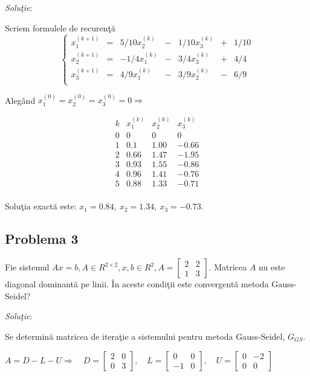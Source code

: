 \documentclass{exam}
\begin{document}
\textit{Solu\c{t}ie}:

Scriem formulele de recuren\c{t}\u{a}
$$\left\{
	\begin{array}{ccccccc}
		x_1^{(k+1)} & = & 5/10x_2^{(k)} & - & 1/10x_3^{(k)} & + & 1/10 \\
		x_2^{(k+1)} & = & -1/4x_1^{(k)} & - & 3/4x_3^{(k)}  & + & 4/4  \\
		x_3^{(k+1)} & = & 4/9x_1^{(k)}  & - & 3/9x_2^{(k)}  & - & 6/9  \\
	\end{array} \right.
$$

Aleg\^{a}nd $x_{1}^{(0)}=x_{2}^{(0)}=x_3^{(0)}=0\Rightarrow$


$$  \begin{array}{c||ccc}
		k & x_1^{(k)} & x_2^{(k)} & x_3^{(k)} \\
		\hline
		0 & 0         & 0         & 0         \\
		1 & 0.1       & 1.00      & -0.66     \\
		2 & 0.66      & 1.47      & -1.95     \\
		3 & 0.93      & 1.55      & -0.86     \\
		4 & 0.96      & 1.41      & -0.76     \\
		5 & 0.88      & 1.33      & -0.71     \\
	\end{array}
$$

Solu\c{t}ia exact\u{a} este: $x_{1}=0.84,\ x_{2}=1.34,\ x_{3}=-0.73$.

\subsection{Problema 3}
Fie sistemul $Ax=b, A \in R^{2\times 2}, x, b \in R^{2},
	A =
	\left[ {\begin{array}{cc}
					2 & 2 \\
					1 & 3
				\end{array} } \right]
$. Matricea $A$ nu este diagonal dominant\u{a} pe linii. \^{I}n aceste condi\c{t}ii este convergent\u{a} metoda Gauss-Seidel?

\textit{Solu\c{t}ie}:

Se determin\u{a} matricea de itera\c{t}ie a sistemului pentru metoda Gauss-Seidel, ${G}_{GS}$.

$A = D - L - U \Rightarrow \quad D = \left[ {\begin{array}{cc}
					2 & 0 \\
					0 & 3
				\end{array} } \right], \quad L =
	\left[ {\begin{array}{cc}
					0  & 0 \\
					-1 & 0
				\end{array} } \right], \quad U =
	\left[ {\begin{array}{cc}
					0 & -2 \\
					0 & 0
				\end{array} } \right]$
\end{document}

